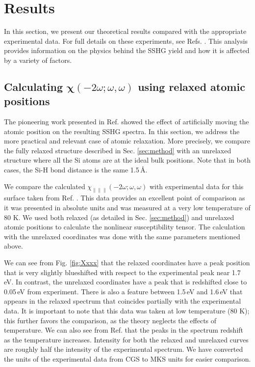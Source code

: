 \documentclass[prb,superscriptaddress,showpacs,twocolumn,letterpaper]{revtex4}
\begin{document}
\section{Results}\label{sec:results}

In this section, we present our theoretical results compared with the
appropriate experimental data. For full details on these experiments, see Refs.
. This analysis
provides information on the physics behind the SSHG yield and how it is affected
by a variety of factors.


\subsection{Calculating
\texorpdfstring{$\boldsymbol{\chi}(-2\omega;\omega,\omega)$}{X(-2w;w,w)} using
relaxed atomic positions}\label{sec:relaxed}

The pioneering work presented in Ref.  showed the effect
of artificially moving the atomic position on the resulting SSHG spectra. In
this section, we address the more practical and relevant case of atomic
relaxation. More precisely, we compare the fully relaxed structure described in
Sec. \ref{sec:method} with an unrelaxed structure where all the Si atoms are at
the ideal bulk positions. Note that in both cases, the Si-H bond distance is the
same 1.5\,\AA.

We compare the calculated
$\chi_{\parallel\parallel\parallel}(-2\omega;\omega,\omega)$ with experimental
data for this surface taken from Ref. . This data
provides an excellent point of comparison as it was presented in absolute units
and was measured at a very low temperature of 80 K. We used both relaxed (as
detailed in Sec. \ref{sec:method}) and unrelaxed atomic positions to calculate
the nonlinear susceptibility tensor. The calculation with the unrelaxed
coordinates was done with the same parameters mentioned above.

We can see from Fig. \ref{fig:Xxxx} that the relaxed coordinates have a peak
position that is very slightly blueshifted with respect to the experimental peak
near 1.7\,eV. In contrast, the unrelaxed coordinates have a peak that is
redshifted close to 0.05\,eV from experiment. There is also a feature between
1.5\,eV and 1.6\,eV that appears in the relaxed spectrum that coincides
partially with the experimental data. It is important to note that this data was
taken at low temperature (80 K); this further favors the comparison, as the
theory neglects the effects of temperature. We can also see from Ref.
 that the peaks in the spectrum redshift as the
temperature increases. Intensity for both the relaxed and unrelaxed curves are
roughly half the intensity of the experimental spectrum. We have converted the
units of the experimental data from CGS to MKS units for easier comparison.
\end{document}
